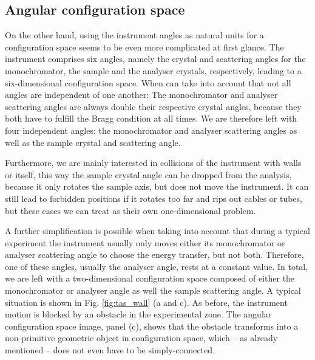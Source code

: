 \subsection{Angular configuration space}
On the other hand, using the instrument angles as natural units for a configuration
space seems to be even more complicated at first glance. 
The instrument comprises six angles, namely the crystal and 
scattering angles for the monochromator, the sample and the analyser crystals, 
respectively, leading to a six-dimensional configuration space. 
When can take into account that not all angles are independent of one another:
The monochromator and analyser scattering angles are always double their 
respective crystal angles, because they both have to fulfill the Bragg condition
at all times. 
We are therefore left with four independent angles: the monochromator and analyser
scattering angles as well as the sample crystal and scattering angle. 

Furthermore, we are mainly interested in collisions of the instrument with walls 
or itself, this way the sample crystal angle can be dropped from the analysis, 
because it only rotates the sample axis, but does not move the instrument. 
It can still lead to forbidden positions if it rotates too far and rips out cables 
or tubes, but these cases we can treat as their own one-dimensional problem. 

A further simplification is possible when taking into account that during a 
typical experiment the instrument usually only moves either its monochromator 
or analyser scattering angle to choose the energy transfer, but not both. 
Therefore, one of these angles, usually the analyser angle, rests at a constant 
value. In total, we are left with a two-dimensional configuration space composed 
of either the monochromator or analyser angle as well the sample scattering angle. 
A typical situation is shown in Fig. \ref{fig:tas_wall} (a and c). 
As before, the instrument motion is blocked by an obstacle in the experimental zone. 
The angular configuration space image, panel (c), shows that the obstacle 
transforms into a non-primitive geometric object in configuration space, 
which -- as already mentioned -- does not even have to be simply-connected.

